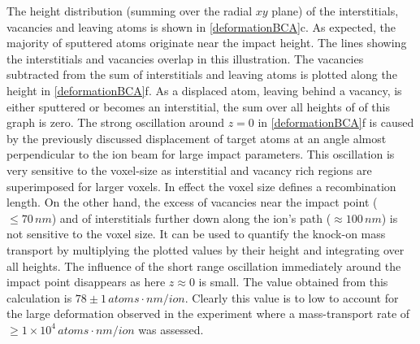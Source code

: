 \documentclass[12pt,
paper=a4,				
DIV=calc,		  %
BCOR=16mm,	  %
headinclude,
openany
]{scrbook}
\begin{document}
The height distribution (summing over the radial $xy$ plane) of the interstitials, vacancies and leaving atoms is shown in \ref{deformationBCA}c. As expected, the majority of sputtered atoms originate near the impact height. The lines showing the interstitials and vacancies overlap in this illustration. The vacancies subtracted from the sum of interstitials and leaving atoms is plotted along the height in \ref{deformationBCA}f. As a displaced atom, leaving behind a vacancy, is either sputtered or becomes an interstitial, the sum over all heights of of this graph is zero. The strong oscillation around $z=0$ in \ref{deformationBCA}f is caused by the previously discussed displacement of target atoms at an angle almost perpendicular to the ion beam for large impact parameters. This oscillation is very sensitive to the voxel-size as interstitial and vacancy rich regions are superimposed for larger voxels. In effect the voxel size defines a recombination length. On the other hand, the excess of vacancies near the impact point ($\le 70\,nm$) and of interstitials further down along the ion's path ($\approx 100\,nm$) is not sensitive to the voxel size. It can be used to quantify the knock-on mass transport by multiplying the plotted values by their height and integrating over all heights. The influence of the short range oscillation immediately around the impact point disappears as here $z \approx 0$ is small. The value obtained from this calculation is $78\pm1\,atoms \cdot nm /ion$. Clearly this value is to low to account for the large deformation observed in the experiment where a mass-transport rate of $\ge 1\times 10^{4}\,atoms \cdot nm /ion$ was assessed.
\end{document}
